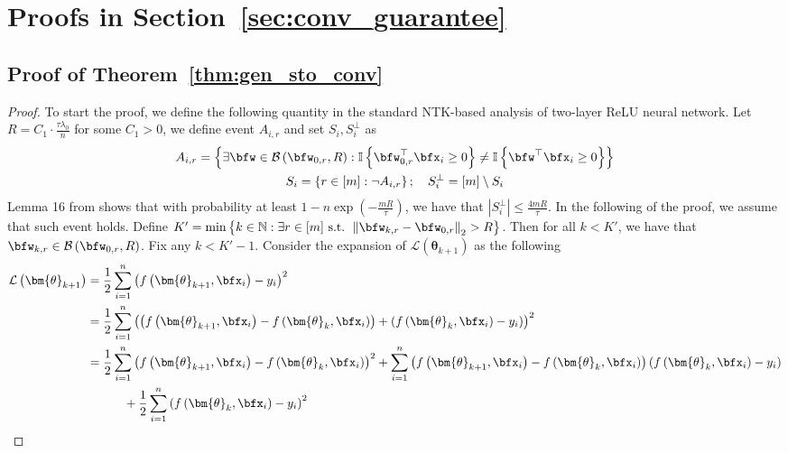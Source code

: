 \documentclass[10pt]{article} %
\theoremstyle{definition}
\theoremstyle{plain}
\newcommand{\paren}[1]{\left(#1\right)}
\newcommand{\norm}[1]{\left\|#1\right\|}
\newcommand{\indy}[1]{\mathbb{I}\left\{#1\right\}}
\def\calL{{\mathcal{L}}}
\begin{document}
\section{Proofs in Section~\ref{sec:conv_guarantee}}
\subsection{Proof of Theorem~\ref{thm:gen_sto_conv}}
\begin{proof}
    To start the proof, we define the following quantity in the standard NTK-based analysis of two-layer ReLU neural network. Let $R = C_1\cdot \frac{\tau\lambda_0}{n}$ for some $C_1 > 0$, we define event $A_{i,r}$ and set $S_i, S_i^\perp$ as
    \begin{gather}
        A_{i,r} = \left\{\exists \bfw\in\mathcal{B}\paren{\bfw_{0,r},R}: \indy{\bfw_{0,r}^\top\bfx_i \geq 0}\neq \indy{\bfw^\top\bfx_i\geq 0}\right\}\\
        S_i = \left\{r\in [m]: \neg A_{i,r}\right\};\quad  S_i^\perp = [m]\setminus S_i
    \end{gather}
    Lemma 16 from \cite{} shows that with probability at least $1 - n\exp\paren{-\frac{mR}{\tau}}$, we have that $\left|S_i^\perp\right|\leq \frac{4mR}{\tau}$. In the following of the proof, we assume that such event holds. 
    Define $K' = \min\left\{k\in\mathbb{N}: \exists r\in[m] \text{ s.t. } \norm{\bfw_{k,r} - \bfw_{0,r}}_2 > R\right\}$. Then for all $k < K'$, we have that $\bfw_{k,r}\in\mathcal{B}\paren{\bfw_{0,r}, R}$. Fix any $k < K' - 1$. Consider the expansion of $\calL\paren{\bm{\theta}_{k+1}}$ as the following
    \begin{equation}
        \label{eq:thm_conv_proof_1}
        \begin{aligned}
            \calL\paren{\bm{\theta}_{k+1}} & = \frac{1}{2}\sum_{i=1}^n\paren{f\paren{\bm{\theta}_{k+1},\bfx_i} - y_i}^2\\
            & = \frac{1}{2}\sum_{i=1}^n\paren{\paren{f\paren{\bm{\theta}_{k+1},\bfx_i} - f\paren{\bm{\theta}_{k},\bfx_i}} + \paren{f\paren{\bm{\theta}_k,\bfx_i} - y_i}}^2\\
            & = \frac{1}{2}\sum_{i=1}^n\paren{f\paren{\bm{\theta}_{k+1},\bfx_i} - f\paren{\bm{\theta}_{k},\bfx_i}}^2 + \sum_{i=1}^n\paren{f\paren{\bm{\theta}_{k+1},\bfx_i} - f\paren{\bm{\theta}_{k},\bfx_i}}\paren{f\paren{\bm{\theta}_k,\bfx_i} - y_i}\\
            &\quad\quad\quad + \frac{1}{2}\sum_{i=1}^n\paren{f\paren{\bm{\theta}_k,\bfx_i} - y_i}^2
        \end{aligned}

\end{equation}
\end{proof}
\end{document}

